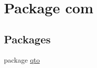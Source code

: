 \hypertarget{namespacecom}{}\section{Package com}
\label{namespacecom}
\subsection*{Packages}
\begin{DoxyCompactItemize}
\item 
package \hyperlink{namespacecom_1_1qto}{qto}
\end{DoxyCompactItemize}
